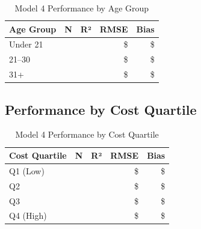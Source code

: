 \begin{table}[h]
\centering
\caption{Model 4 Performance by Age Group}
\begin{tabular}{lrrrr}
\toprule
\textbf{Age Group} & \textbf{N} & \textbf{R²} & \textbf{RMSE} & \textbf{Bias} \\
\midrule
Under 21 & \ModelFourSubgroupageAgeUnderTwentyOneN{} & \ModelFourSubgroupageAgeUnderTwentyOneRSquared{} & \$\ModelFourSubgroupageAgeUnderTwentyOneRMSE{} & \$\ModelFourSubgroupageAgeUnderTwentyOneBias{} \\
21--30 & \ModelFourSubgroupageAgeTwentyOneToThirtyN{} & \ModelFourSubgroupageAgeTwentyOneToThirtyRSquared{} & \$\ModelFourSubgroupageAgeTwentyOneToThirtyRMSE{} & \$\ModelFourSubgroupageAgeTwentyOneToThirtyBias{} \\
31+ & \ModelFourSubgroupageAgeThirtyOnePlusN{} & \ModelFourSubgroupageAgeThirtyOnePlusRSquared{} & \$\ModelFourSubgroupageAgeThirtyOnePlusRMSE{} & \$\ModelFourSubgroupageAgeThirtyOnePlusBias{} \\
\bottomrule
\end{tabular}
\end{table}

\subsection{Performance by Cost Quartile}

\begin{table}[h]
\centering
\caption{Model 4 Performance by Cost Quartile}
\begin{tabular}{lrrrr}
\toprule
\textbf{Cost Quartile} & \textbf{N} & \textbf{R²} & \textbf{RMSE} & \textbf{Bias} \\
\midrule
Q1 (Low) & \ModelFourSubgroupcostQOneLowN{} & \ModelFourSubgroupcostQOneLowRSquared{} & \$\ModelFourSubgroupcostQOneLowRMSE{} & \$\ModelFourSubgroupcostQOneLowBias{} \\
Q2 & \ModelFourSubgroupcostQTwoN{} & \ModelFourSubgroupcostQTwoRSquared{} & \$\ModelFourSubgroupcostQTwoRMSE{} & \$\ModelFourSubgroupcostQTwoBias{} \\
Q3 & \ModelFourSubgroupcostQThreeN{} & \ModelFourSubgroupcostQThreeRSquared{} & \$\ModelFourSubgroupcostQThreeRMSE{} & \$\ModelFourSubgroupcostQThreeBias{} \\
Q4 (High) & \ModelFourSubgroupcostQFourHighN{} & \ModelFourSubgroupcostQFourHighRSquared{} & \$\ModelFourSubgroupcostQFourHighRMSE{} & \$\ModelFourSubgroupcostQFourHighBias{} \\
\bottomrule
\end{tabular}
\end{table}

